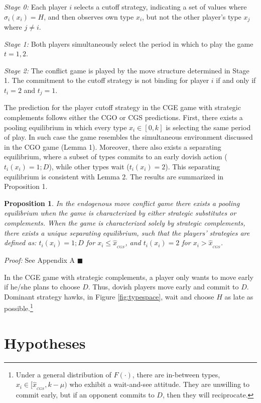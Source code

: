 \documentclass[12pt, letterpaper]{article}
\theoremstyle{plain}
\begin{document}
\textit{Stage 0:} Each player $i$ selects a cutoff strategy, indicating a set of values where $\sigma_i(x_i)=H$, and then observes own type $x_i$, but not the other player's type $x_j$ where $j\neq i$.

 \textit{Stage 1:} Both players simultaneously select the period in which to play the game $t=1,2$. 

\textit{Stage 2:} The conflict game is played by the move structure determined in Stage 1. The commitment to the cutoff strategy is not binding for player $i$ if and only if $t_i=2$ and $t_j=1$. 

The prediction for the player cutoff strategy in the CGE game with strategic complements follows either the CGO or CGS predictions. First, there exists a pooling equilibrium in which every type $x_i \in [0,k]$ is selecting the same period of play. In such case the game resembles the simultaneous environment discussed in the CGO game (Lemma 1). Moreover, there also exists a separating equilibrium, where a subset of types commits to an early dovish action ($t_{i}(x_i)=1; D$), while other types wait ($t_{i}(x_i)=2$). This separating equilibrium is consistent with Lemma 2. The results are summarized in Proposition 1.

\newtheorem{prop}{Proposition}
\begin{prop}
In the endogenous move conflict game there exists a pooling equilibrium  when the game is characterized by either strategic substitutes or complements. When the game is characterized solely by strategic complements, there exists a unique separating equilibrium, such that the players' strategies are defined as: $t_{i}(x_i)=1; D$ for $x_i\leq \hat{x}_{_{CGS}}$, and $t_{i}(x_i)=2$ for $x_i>\hat{x}_{_{CGS}}$. 

\end{prop}\par
\noindent \textit{Proof:} See Appendix A $\blacksquare$

In the CGE game with strategic complements, a player only wants to move early if he/she plans to choose $D$. Thus, dovish players move early and commit to $D$. Dominant strategy hawks, in Figure \ref{fig:typespace}, wait and choose $H$ as late as possible.\footnote{Under a general distribution of $F(\cdot)$, there are in-between types, $x_i \in [ \hat{x}_{_{CGS}}, k-\mu)$ who exhibit a wait-and-see attitude. They are unwilling to commit early, but if an opponent commits to $D$, then they will reciprocate.}

\section{Hypotheses}
\end{document}
